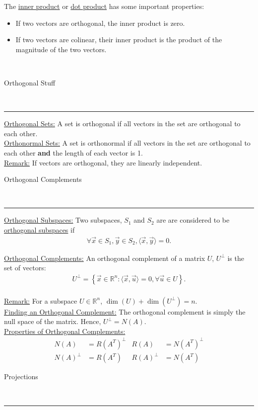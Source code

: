 \documentclass{article}
\newcommand{\header}[1]{\begin{large}\noindent #1\end{large}\\\rule{\textwidth}{0.5pt}}
\newcommand{\gap}{\medskip\\}
\newcommand{\sheader}[1]{\underline{#1:}}
\newcommand{\curly}[1]{\left\{#1\right\}}
\begin{document}
The \underline{inner product} or \underline{dot product} has some important
properties:
\begin{itemize}
    \item If two vectors are orthogonal, the inner product is zero.
    \item If two vectors are colinear, their inner product is the product of the 
    magnitude of the two vectors.
\end{itemize}
\gap
\header{Orthogonal Stuff}
\sheader{Orthogonal Sets} A set is orthogonal if all vectors in the set 
are orthogonal to each other.
\gap
\sheader{Orthonormal Sets} A set is orthonormal if all vectors in the set 
are orthogonal to each other \textbf{and} the length of each vector is 1.
\gap
\sheader{Remark} If vectors are orthogonal, they are linearly independent. 
\gap
\header{Orthogonal Complements}
\sheader{Orthogonal Subspaces} Two subspaces, $S_1$ and $S_2$ are are considered to be 
\underline{orthogonal subspaces} if
\begin{align*}
    \forall \vec{x} \in S_1, \vec{y} \in S_2, \langle\vec{x}, \vec{y}\rangle = 0.
\end{align*}

\sheader{Orthogonal Complements} An orthogonal complement of 
a matrix $U$, $U^\perp$ is the set of vectors:
\begin{align*}
    U^\perp = \curly{\vec{x} \in \mathbb{R}^n : \langle\vec{x}, \vec{u}\rangle = 0, \forall \vec{u} \in U}. 
\end{align*}
\gap
\sheader{Remark} For a subspace $U \in \mathbb{R}^n$, $\dim(U) + \dim(U^\perp) = n$.
\gap
\sheader{Finding an Orthogonal Complement} The orthogonal complement is 
simply the null space of the matrix. Hence, $U^\perp = N(A)$.
\gap
\sheader{Properties of Orthogonal Complements}
\begin{align*}
    N(A) &= R(A^T)^\perp & R(A) &= N(A^T)^\perp\\
    N(A)^\perp &= R(A^T) & R(A)^\perp &= N(A^T)
\end{align*}

\header{Projections}
\end{document}
